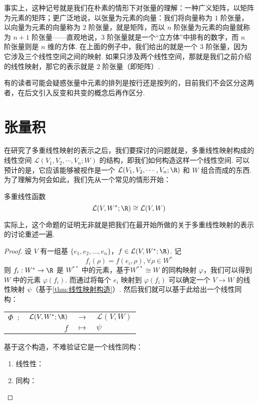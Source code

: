 事实上，这种记号就是我们在朴素的情形下对张量的理解：一种广义矩阵，以矩阵为元素的矩阵；更广泛地说，以张量为元素的向量：我们将向量称为 $1$ 阶张量，以向量为元素的向量称为 $2$ 阶张量，就是矩阵，而以 $n$ 阶张量为元素的向量就称为 $n + 1$ 阶张量——直观地说，$3$ 阶张量就是一个“立方体”中排有的数字，而 $n$ 阶张量则是 $n$ 维的方体. 在上面的例子中，我们给出的就是一个 $3$ 阶张量，因为它涉及三个线性空间之间的映射. 如果只涉及两个线性空间，那就是我们之前介绍的线性映射，那它的表示就是 $2$ 阶张量（即矩阵）.

有的读者可能会疑惑张量中元素的排列是按行还是按列的，目前我们不会区分这两者，在后文引入反变和共变的概念后再作区分.

\section{张量积}

在研究了多重线性映射的表示之后，我们要探讨的问题就是，多重线性映射构成的线性空间 $\mathcal{L}(V_1, V_2, \cdots, V_n; W)$ 的结构，即我们如何构造这样一个线性空间. 可以预计的是，它应该能够被视作是一个 $\mathcal{L}(V_1, V_2, \cdots, V_n; \R)$ 和 $W$ 组合而成的东西. 为了理解为何会如此，我们先从一个常见的情形开始：

\begin{lemma}{}{多重线性函数}
    \[
    \mathcal{L}(V, W^*; \R) \cong \mathcal{L}(V, W)
    \]
\end{lemma}

实际上，这个命题的证明无非就是把我们在最开始所做的关于多重线性映射的表示的讨论重述一遍.

\begin{proof}
    设 $V$ 有一组基 $\{e_1, e_2, \dots, e_n\}$，$f \in \mathcal{L}(V, W^*; \R)$. 记
    \[
    f_i (\rho) = f(e_i, \rho), \forall \rho \in W^*
    \]
    则 $f_i: W^* \to \R$ 是 $W^{**}$ 中的元素，基于$W^{**} \cong W$ 的同构映射 $\varphi$，我们可以得到 $W$ 中的元素 $\varphi(f_i)$. 而通过将每个 $e_i$ 映射到 $\varphi(f_i)$ 可以确定一个 $V \to W$ 的线性映射 $\psi$（基于\autoref{thm:线性映射构造}）. 然后我们就可以基于此给出一个线性同构：
    \begin{center}
        \begin{tabular}{rrcl}
            $\Phi\enspace\colon$      & $\mathcal{L}(V, W^*; \R)$ & $\to$     & $\mathcal{L}(V, W)$ \\
                                   & $f$                      & $\mapsto$ & $\psi$
        \end{tabular}
    \end{center}

    基于这个构造，不难验证它是一个线性同构：
    \begin{enumerate}
        \item 线性性：
        \item 同构：
    \end{enumerate}
\end{proof}

